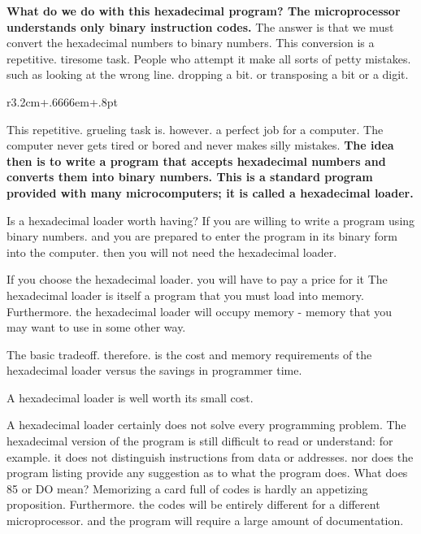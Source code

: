 \documentclass{book}
\begin{document}
\textbf{What do we do with this hexadecimal program? The microprocessor understands only binary instruction codes.} The answer is that we must convert the hexadecimal numbers to binary numbers. This conversion is a repetitive. tiresome task. People who attempt it make all sorts of petty mistakes. such as looking at the wrong line. dropping a bit. or transposing a bit or a digit.

\begin{wrapfigure}{r}{3.2cm+.6666em+.8pt}
\end{wrapfigure}
This repetitive. grueling task is. however. a perfect job for a computer. The computer never gets tired or bored and never makes silly mistakes. \textbf{The idea then is to write a program that accepts hexadecimal numbers and converts them into binary numbers. This is a standard program provided with many microcomputers; it is called a hexadecimal loader.}

Is a hexadecimal loader worth having? If you are willing to write a program using binary numbers. and you are prepared to enter the program in its binary form into the computer. then you will not need the hexadecimal loader.

If you choose the hexadecimal loader. you will have to pay a price for it The hexadecimal loader is itself a program that you must load into memory. Furthermore. the hexadecimal loader will occupy memory - memory that you may want to use in some other way.

The basic tradeoff. therefore. is the cost and memory requirements of the hexadecimal loader versus the savings in programmer time.

A hexadecimal loader is well worth its small cost.

A hexadecimal loader certainly does not solve every programming problem. The hexadecimal version of the program is still difficult to read or understand: for example. it does not distinguish instructions from data or addresses. nor does the program listing provide any suggestion as to what the program does. What does 85 or DO mean? Memorizing a card full of codes is hardly an appetizing proposition. Furthermore. the codes will be entirely different for a different microprocessor. and the program will require a large amount of documentation.
\end{document}

